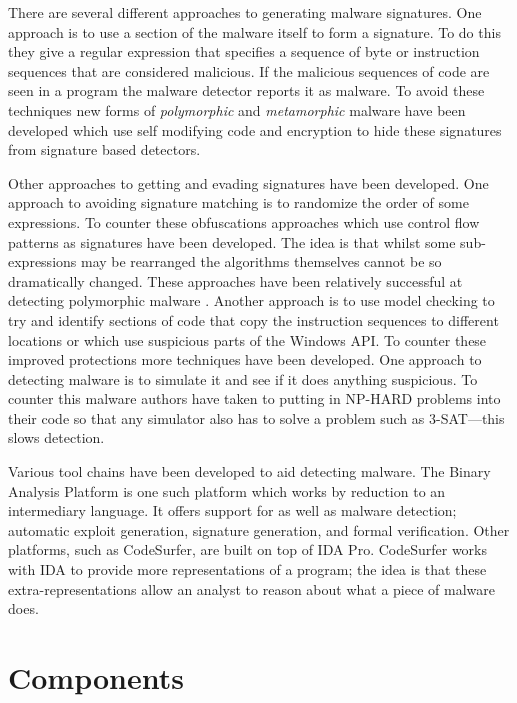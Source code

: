 \documentclass[10pt,]{book}
\begin{document}
There are several different approaches to generating malware signatures.
One approach is to use a section of the malware itself to form a
signature. To do this they give a regular expression that specifies a
sequence of byte or instruction sequences that are considered malicious.
If the malicious sequences of code are seen in a program the malware
detector reports it as malware. To avoid these techniques new forms of
\emph{polymorphic} and \emph{metamorphic} malware have been developed
which use self modifying code and encryption to hide these signatures
from signature based detectors\autocite{Christodorescu:2005vf}.

Other approaches to getting and evading signatures have been developed.
One approach to avoiding signature matching is to randomize the order of
some
expressions\autocite{Borello:2008vx}\autocite{Christodorescu:2005vf}. To
counter these obfuscations approaches which use control flow patterns as
signatures have been developed\autocite{Bonfante:2007th}. The idea is
that whilst some sub-expressions may be rearranged the algorithms
themselves cannot be so dramatically changed. These approaches have been
relatively successful at detecting polymorphic malware
\autocite{Kang:2011bs}\autocite{Bruschi:vb}. Another approach is to use
model checking to try and identify sections of code that copy the
instruction sequences to different locations or which use suspicious
parts of the Windows API\autocite{Kinder:2005hu}. To counter these
improved protections more techniques have been developed. One approach
to detecting malware is to simulate it and see if it does anything
suspicious. To counter this malware authors have taken to putting in
NP-HARD problems into their code so that any simulator also has to solve
a problem such as 3-SAT\autocite{Moser:2007cd}---this slows detection.

Various tool chains have been developed to aid detecting malware. The
Binary Analysis Platform\autocite{Brumley:wn} is one such platform which
works by reduction to an intermediary language. It offers support for as
well as malware detection; automatic exploit
generation\autocite{Avgerinos:vo}, signature generation, and formal
verification. Other platforms, such as
CodeSurfer\autocite{Balakrishnan:2005tx}, are built on top of IDA
Pro\autocite{HexRays:up}. CodeSurfer works with IDA to provide more
representations of a program; the idea is that these
extra-representations allow an analyst to reason about what a piece of
malware does.

\chapter{Components}
\end{document}

